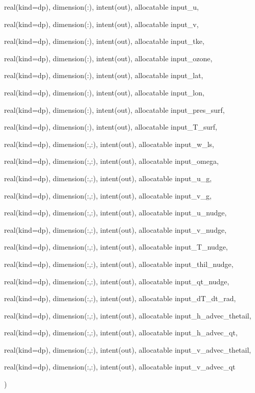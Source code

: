 {\begin{DoxyParamCaption}
\item[{real(kind=dp), dimension(\+:), intent(out), allocatable}]{input\+\_\+u, }
\item[{real(kind=dp), dimension(\+:), intent(out), allocatable}]{input\+\_\+v, }
\item[{real(kind=dp), dimension(\+:), intent(out), allocatable}]{input\+\_\+tke, }
\item[{real(kind=dp), dimension(\+:), intent(out), allocatable}]{input\+\_\+ozone, }
\item[{real(kind=dp), dimension(\+:), intent(out), allocatable}]{input\+\_\+lat, }
\item[{real(kind=dp), dimension(\+:), intent(out), allocatable}]{input\+\_\+lon, }
\item[{real(kind=dp), dimension(\+:), intent(out), allocatable}]{input\+\_\+pres\+\_\+surf, }
\item[{real(kind=dp), dimension(\+:), intent(out), allocatable}]{input\+\_\+\+T\+\_\+surf, }
\item[{real(kind=dp), dimension(\+:,\+:), intent(out), allocatable}]{input\+\_\+w\+\_\+ls, }
\item[{real(kind=dp), dimension(\+:,\+:), intent(out), allocatable}]{input\+\_\+omega, }
\item[{real(kind=dp), dimension(\+:,\+:), intent(out), allocatable}]{input\+\_\+u\+\_\+g, }
\item[{real(kind=dp), dimension(\+:,\+:), intent(out), allocatable}]{input\+\_\+v\+\_\+g, }
\item[{real(kind=dp), dimension(\+:,\+:), intent(out), allocatable}]{input\+\_\+u\+\_\+nudge, }
\item[{real(kind=dp), dimension(\+:,\+:), intent(out), allocatable}]{input\+\_\+v\+\_\+nudge, }
\item[{real(kind=dp), dimension(\+:,\+:), intent(out), allocatable}]{input\+\_\+\+T\+\_\+nudge, }
\item[{real(kind=dp), dimension(\+:,\+:), intent(out), allocatable}]{input\+\_\+thil\+\_\+nudge, }
\item[{real(kind=dp), dimension(\+:,\+:), intent(out), allocatable}]{input\+\_\+qt\+\_\+nudge, }
\item[{real(kind=dp), dimension(\+:,\+:), intent(out), allocatable}]{input\+\_\+d\+T\+\_\+dt\+\_\+rad, }
\item[{real(kind=dp), dimension(\+:,\+:), intent(out), allocatable}]{input\+\_\+h\+\_\+advec\+\_\+thetail, }
\item[{real(kind=dp), dimension(\+:,\+:), intent(out), allocatable}]{input\+\_\+h\+\_\+advec\+\_\+qt, }
\item[{real(kind=dp), dimension(\+:,\+:), intent(out), allocatable}]{input\+\_\+v\+\_\+advec\+\_\+thetail, }
\item[{real(kind=dp), dimension(\+:,\+:), intent(out), allocatable}]{input\+\_\+v\+\_\+advec\+\_\+qt}
\end{DoxyParamCaption}
)}\hypertarget{group__input_ga0941c411598781019aef6c3a047a040c}{}\label{group__input_ga0941c411598781019aef6c3a047a040c}


